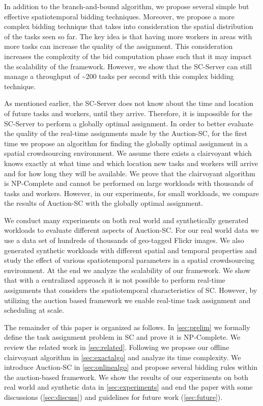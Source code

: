 In addition to the branch-and-bound algorithm, we propose several simple but effective spatiotemporal bidding techniques. Moreover, we propose a more complex bidding technique that takes into consideration the spatial distribution of the tasks seen so far. The key idea is that having more workers in areas with more tasks can increase the quality of the assignment. This consideration increases the complexity of the bid computation phase such that it may impact the scalability of the framework. However, we show that the SC-Server can still manage a throughput of \textasciitilde 200 tasks per second with this complex bidding technique.

As mentioned earlier, the SC-Server does not know about the time and location of future tasks and workers, until they arrive. Therefore, it is impossible for the SC-Server to perform a globally optimal assignment. In order to better evaluate the quality of the real-time assignments made by the Auction-SC, for the first time we propose an algorithm for finding the globally optimal assignment in a spatial crowdsourcing environment. We assume there exists a clairvoyant which knows exactly at what time and which location new tasks and workers will arrive and for how long they will be available. We prove that the clairvoyant algorithm is NP-Complete and cannot be performed on large workloads with thousands of tasks and workers. However, in our experiments, for small workloads, we compare the results of Auction-SC with the globally optimal assignment.

We conduct many experiments on both real world and synthetically generated workloads to evaluate different aspects of Auction-SC. For our real world data we use a data set of hundreds of thousands of geo-tagged Flickr images. We also generated synthetic workloads with different spatial and temporal properties and study the effect of various spatiotemporal parameters in a spatial crowdsourcing environment. At the end we analyze the scalability of our framework. We show that with a centralized approach it is not possible to perform real-time assignments that considers the spatiotemporal characteristics of SC. However, by utilizing the auction based framework we enable real-time task assignment and scheduling at scale. 

The remainder of this paper is organized as follows. In \cref{sec:prelim} we formally define the task assignment problem in SC and prove it is NP-Complete. We review the related work in \cref{sec:related}. Following we propose our offline clairvoyant algorithm in \cref{sec:exactalgo} and analyze its time complexity. We introduce Auction-SC in \cref{sec:onlinealgo} and propose several bidding rules within the auction-based framework. We show the results of our experiments on both real world and synthetic data in \cref{sec:experiments} and end the paper with some discussions (\cref{sec:discuss}) and guidelines for future work (\cref{sec:future}).